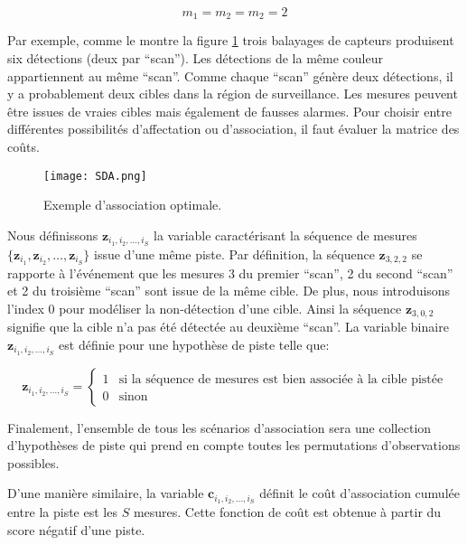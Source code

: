 \documentclass[10pt,french,a4paper]{report}
\begin{document}
\begin{equation}
m_1 =m_2 = m_2 =2
\end{equation}

Par exemple, comme le montre la figure \ref{fig:SDA} trois balayages de capteurs produisent six détections (deux par ``scan''). Les détections de la même couleur appartiennent au même ``scan''. Comme chaque ``scan'' génère deux détections, il y a probablement deux cibles dans la région de surveillance. Les mesures peuvent être issues de vraies cibles mais également de fausses alarmes. Pour choisir entre différentes possibilités d'affectation ou d'association, il faut évaluer la matrice des coûts.
\begin{center}
\begin{figure}
\texttt{[image: SDA.png]} 
\caption{Exemple d'association optimale.}
\label{fig:SDA}
\end{figure}		 
\end{center}		 
		 

Nous définissons $\mathbf{z}_{i_{1},i_{2}, \ldots,i_{S}}$ la variable caractérisant la séquence de mesures $\{\mathbf{z}_{i_1}, \mathbf{z}_{i_2}, \ldots,\mathbf{z}_{i_S}\}$ issue d'une même piste. 
Par définition, la séquence $\mathbf{z}_{3,2,2}$ se rapporte à l'événement que les mesures 3 du premier ``scan'', 2 du second ``scan'' et 2 du troisième ``scan'' sont issue de la même cible. 
De plus, nous introduisons l'index 0 pour modéliser la non-détection d'une cible. Ainsi la séquence $\mathbf{z}_{3,0,2}$ signifie que la cible n'a pas été détectée au deuxième ``scan''. La variable binaire $\mathbf{z}_{i_1,i_2, \ldots,i_S}$ est définie pour une hypothèse de piste telle que:

 	 	   \begin{equation}   	 	   
 	   \mathbf{z}_{i_1,i_2, \ldots,i_S}=
 	   	   \begin{cases}
 1 & \text{si la séquence de mesures est bien associée à la cible pistée} \\ 
  0 & \text{sinon}
 	  \end{cases} 
 	    \end{equation}
 	    

Finalement, l'ensemble de tous les scénarios d'association sera une collection d'hypothèses de piste qui prend
en compte toutes les permutations d'observations possibles. 

D'une manière similaire, la variable $\mathbf{c}_{i_1,i_2, \ldots,i_S}$ définit le coût d'association cumulée entre la piste est les $S$ mesures.
Cette fonction de coût est obtenue à partir du score négatif d'une piste.
\end{document}
